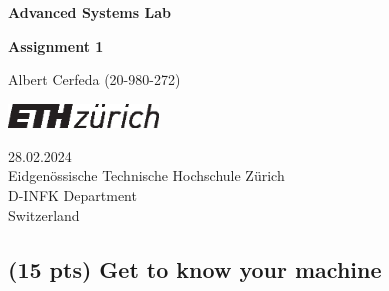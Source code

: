 \documentclass[tikz,14pt,fleqn]{article}
\newcommand\namesurname{Albert Cerfeda (20-980-272)}
\newcommand\assignment{Assignment 1}
\newcommand\subject{Advanced Systems Lab}
\newcommand\documentdate{28.02.2024}
\begin{document}
\begin{titlepage}
   \begin{center}
       \vspace*{0.2cm}

       \textbf{\Large{\subject}}

       \vspace{0.5cm}
        \textbf{\assignment}\\[5mm]
        
            
       \vspace{0.4cm}

        \namesurname
        \begin{figure}[H]
            \centering
        \end{figure}
       \tableofcontents 

       \vspace*{\fill}
     
        \includegraphics[width=0.3\textwidth]{fig/eth_logo_kurz_pos.eps}
       
        \documentdate \\ 
        Eidgenössische Technische Hochschule Zürich\\
        D-INFK Department\\
        Switzerland\\

   \end{center}
\end{titlepage}

\renewcommand{\thesubsubsection}{\alph{subsubsection})}
\setcounter{section}{1}
\setcounter{subsection}{0}

\subsection{(15 pts) Get to know your machine}
\end{document}
